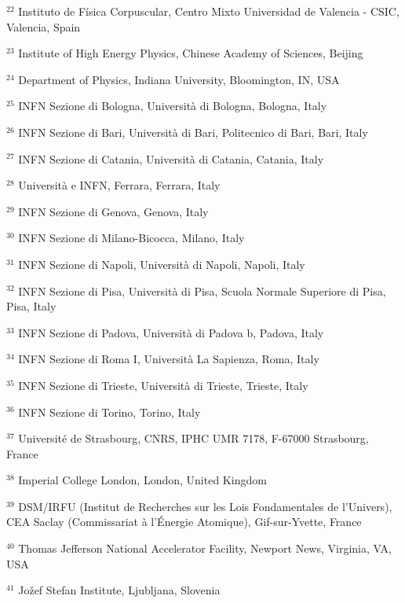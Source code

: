 \par {\footnotesize $^{22}$ Instituto de Física Corpuscular, Centro Mixto Universidad de Valencia - CSIC, Valencia, Spain}
\par {\footnotesize $^{23}$ Institute of High Energy Physics, Chinese Academy of Sciences, Beijing}
\par {\footnotesize $^{24}$ Department of Physics, Indiana University, Bloomington, IN, USA}
\par {\footnotesize $^{25}$ INFN Sezione di Bologna, Università di Bologna, Bologna, Italy}
\par {\footnotesize $^{26}$ INFN Sezione di Bari, Università di Bari, Politecnico di Bari, Bari, Italy}
\par {\footnotesize $^{27}$ INFN Sezione di Catania, Università di Catania, Catania, Italy}
\par {\footnotesize $^{28}$ Università e INFN, Ferrara, Ferrara, Italy}
\par {\footnotesize $^{29}$ INFN Sezione di Genova, Genova, Italy}
\par {\footnotesize $^{30}$ INFN Sezione di Milano-Bicocca, Milano, Italy}
\par {\footnotesize $^{31}$ INFN Sezione di Napoli, Università di Napoli, Napoli, Italy}
\par {\footnotesize $^{32}$ INFN Sezione di Pisa, Università di Pisa, Scuola Normale Superiore di Pisa, Pisa, Italy}
\par {\footnotesize $^{33}$ INFN Sezione di Padova, Università di Padova b, Padova, Italy}
\par {\footnotesize $^{34}$ INFN Sezione di Roma I, Università La Sapienza, Roma, Italy}
\par {\footnotesize $^{35}$ INFN Sezione di Trieste, Università di Trieste, Trieste, Italy}
\par {\footnotesize $^{36}$ INFN Sezione di Torino, Torino, Italy}
\par {\footnotesize $^{37}$ Université de Strasbourg, CNRS, IPHC UMR 7178, F-67000 Strasbourg, France}
\par {\footnotesize $^{38}$ Imperial College London, London, United Kingdom}
\par {\footnotesize $^{39}$ DSM/IRFU (Institut de Recherches sur les Lois Fondamentales de l’Univers), CEA Saclay (Commissariat à l’Énergie Atomique), Gif-sur-Yvette, France}
\par {\footnotesize $^{40}$ Thomas Jefferson National Accelerator Facility, Newport News, Virginia, VA, USA}
\par {\footnotesize $^{41}$ Jožef Stefan Institute, Ljubljana, Slovenia}
